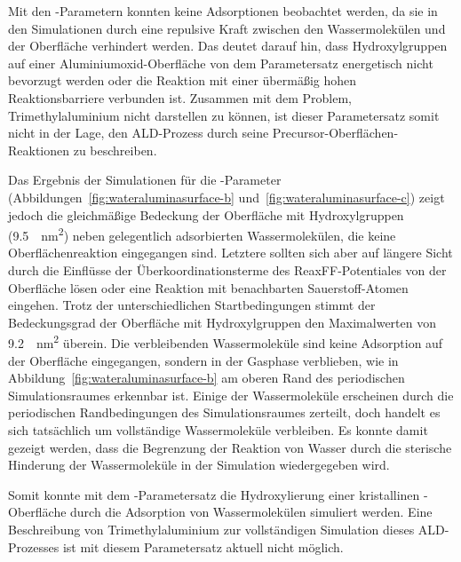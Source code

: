 Mit den -Parametern konnten keine Adsorptionen beobachtet werden, da sie in den Simulationen durch eine repulsive Kraft zwischen den Wassermolekülen und der Oberfläche verhindert werden.
Das deutet darauf hin, dass Hydroxylgruppen auf einer Aluminiumoxid-Oberfläche von dem Parametersatz energetisch nicht bevorzugt werden oder die Reaktion mit einer übermäßig hohen Reaktionsbarriere verbunden ist.
Zusammen mit dem Problem, Trimethylaluminium nicht darstellen zu können, ist dieser Parametersatz somit nicht in der Lage, den ALD-Prozess durch seine Precursor-Oberflächen-Reaktionen zu beschreiben.

Das Ergebnis der Simulationen für die -Parameter (Abbildungen~\ref{fig:wateraluminasurface-b} und~\ref{fig:wateraluminasurface-c}) zeigt jedoch die gleichmäßige Bedeckung der Oberfläche mit Hydroxylgruppen (\SI{9.5}{\per\square\nano\meter}) neben gelegentlich adsorbierten Wassermolekülen, die keine Oberflächenreaktion eingegangen sind.
Letztere sollten sich aber auf längere Sicht durch die Einflüsse der Überkoordinationsterme des ReaxFF-Potentiales von der Oberfläche lösen oder eine Reaktion mit benachbarten Sauerstoff-Atomen eingehen.
Trotz der unterschiedlichen Startbedingungen stimmt der Bedeckungsgrad der Oberfläche mit Hydroxylgruppen den Maximalwerten von \SI{9.2}{\per\square\nano\meter}\cite{kim_energy_2011} überein.
Die verbleibenden Wassermoleküle sind keine Adsorption auf der Oberfläche eingegangen, sondern in der Gasphase verblieben, wie in Abbildung~\ref{fig:wateraluminasurface-b} am oberen Rand des periodischen Simulationsraumes erkennbar ist.
Einige der Wassermoleküle erscheinen durch die periodischen Randbedingungen des Simulationsraumes zerteilt, doch handelt es sich tatsächlich um vollständige Wassermoleküle verbleiben.
Es konnte damit gezeigt werden, dass die Begrenzung der Reaktion von Wasser durch die sterische Hinderung der Wassermoleküle in der Simulation wiedergegeben wird.

Somit konnte mit dem -Parametersatz die Hydroxylierung einer kristallinen -Ober\-fläche durch die Adsorption von Wassermolekülen simuliert werden.
Eine Beschreibung von Trimethylaluminium zur vollständigen Simulation dieses ALD-Prozesses ist mit diesem Parametersatz aktuell nicht möglich.
